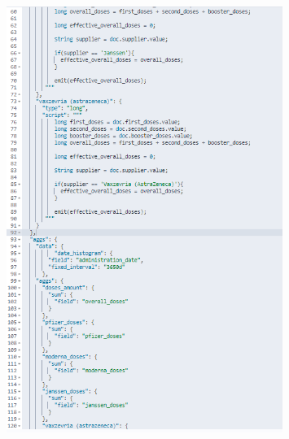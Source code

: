 \documentclass{article}[IEEEtran]
\begin{document}
\begin{figure}[H]
\begin{center}
\begin{minipage}[b]{0.4\textwidth}
    \includegraphics[width=0.8\textwidth, frame]{Query_2BIS_2.PNG}
     \subcaption{}
\end{minipage}


\end{center}
\end{figure}
\end{document}
